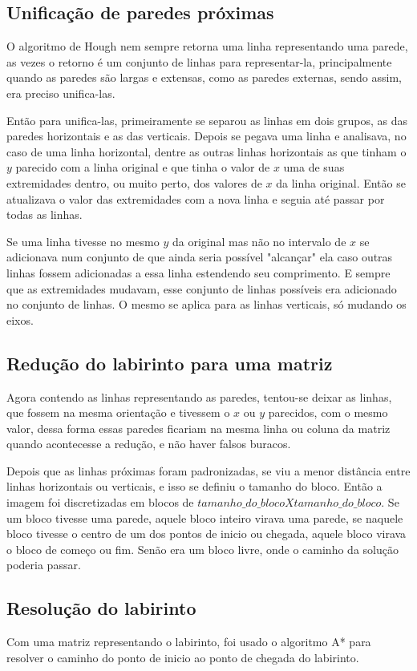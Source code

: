 \documentclass[conference]{IEEEtran}
\begin{document}
\subsection{Unificação de paredes próximas}
O algoritmo de Hough nem sempre retorna uma linha representando uma parede, as vezes o retorno é um conjunto de linhas para representar-la, principalmente quando as paredes são largas e extensas, como as paredes externas, sendo assim, era preciso unifica-las.

Então para unifica-las, primeiramente se separou as linhas em dois grupos, as das paredes horizontais e as das verticais. Depois se pegava uma linha e analisava, no caso de uma linha horizontal, dentre as outras linhas horizontais as que tinham o \(y\) parecido com a linha original e que tinha o valor de \(x\) uma de suas extremidades dentro, ou muito perto, dos valores de \(x\) da linha original. Então se atualizava o valor das extremidades com a nova linha e seguia até passar por todas as linhas.

Se uma linha tivesse no mesmo \(y\) da original mas não no intervalo de \(x\) se adicionava num conjunto de que ainda seria possível "alcançar" ela caso outras linhas fossem adicionadas a essa linha estendendo seu comprimento. E sempre que as extremidades mudavam, esse conjunto de linhas possíveis era adicionado no conjunto de linhas. O mesmo se aplica para as linhas verticais, só mudando os eixos.

\subsection{Redução do labirinto para uma matriz}
Agora contendo as linhas representando as paredes, tentou-se deixar as linhas, que fossem na mesma orientação e tivessem o \(x\) ou \(y\) parecidos, com o mesmo valor, dessa forma essas paredes ficariam na mesma linha ou coluna da matriz quando acontecesse a redução, e não haver falsos buracos.

Depois que as linhas próximas foram padronizadas, se viu a menor distância entre linhas horizontais ou verticais, e isso se definiu o tamanho do bloco. Então a imagem foi discretizadas em blocos de \(tamanho\_do\_bloco X tamanho\_do\_bloco\). Se um bloco tivesse uma parede, aquele bloco inteiro virava uma parede, se naquele bloco tivesse o centro de um dos pontos de inicio ou chegada, aquele bloco virava o bloco de começo ou fim. Senão era um bloco livre, onde o caminho da solução poderia passar.
\subsection{Resolução do labirinto}
Com uma matriz representando o labirinto, foi usado o algoritmo A* para resolver o caminho do ponto de inicio ao ponto de chegada do labirinto.
\end{document}
